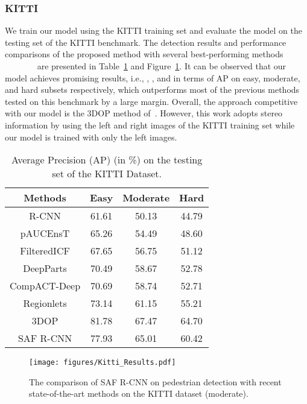 \documentclass[journal]{IEEEtran}
\begin{document}
\subsubsection{KITTI}
We train our model using the KITTI training set and evaluate the model on the testing set of the KITTI benchmark. The detection results and performance comparisons of the proposed method with several best-performing methods ~\cite{hosang2015taking}~\cite{paisitkriangkrai2014strengthening}~\cite{zhang2015filtered}~\cite{tian2015deep}~\cite{compact}~\cite{wang2013regionlets}~\cite{chen20153d} are presented in Table~\ref{tab:Kitti_Results} and Figure~\ref{fig:Kitti_Results}. It can be observed that our model achieves promising results, i.e., , , and  in terms of AP on easy, moderate, and hard subsets respectively, which outperforms most of the previous methods tested on this benchmark by a large margin. Overall, the approach competitive with our model is the 3DOP method of~\cite{chen20153d}. However, this work adopts stereo information by using the left and right images of the KITTI training set while our model is trained with only the left images.



\begin{table}\setlength{\tabcolsep}{3pt}
	\centering\scriptsize
	\caption{Average Precision (AP) (in \%) on the testing set of the KITTI Dataset.}\label{tab:Kitti_Results}
	\renewcommand{\arraystretch}{1.3}
	\begin{tabular}{c | c | c | c}
\hline
		{\bf Methods} & {\bf Easy} & {\bf Moderate} & {\bf Hard}\\ \hline
		R-CNN & 61.61 & 50.13 & 44.79 \\
		pAUCEnsT & 65.26 & 54.49 & 48.60 \\
		FilteredICF & 67.65 & 56.75 & 51.12 \\
		DeepParts & 70.49 & 58.67 & 52.78 \\
		CompACT-Deep & 70.69 & 58.74 & 52.71 \\
		Regionlets & 73.14 & 61.15 & 55.21 \\		
		3DOP & 81.78 & 67.47 & 64.70 \\	\hline			
		SAF R-CNN & 77.93 & 65.01 & 60.42 \\				
\hline
	\end{tabular}\end{table}

\begin{figure}
	\begin{center}
		\texttt{[image: figures/Kitti\_Results.pdf]}
		\caption{The comparison of SAF R-CNN on pedestrian detection with recent state-of-the-art methods on the KITTI dataset (moderate).}	
		\label{fig:Kitti_Results}
	\end{center}
	\vspace{-4mm}
\end{figure}
\end{document}
